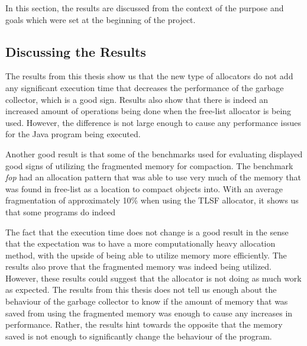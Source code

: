 
In this section, the results are discussed from the context of the purpose and goals which were set at the beginning of the project. 

\subsection{Discussing the Results}
The results from this thesis show us that the new type of allocators do not add any significant execution time that decreases the performance of the garbage collector, which is a good sign. Results also show that there is indeed an increased amount of operations being done when the free-list allocator is being used. However, the difference is not large enough to cause any performance issues for the Java program being executed. 

Another good result is that some of the benchmarks used for evaluating displayed good signs of utilizing the fragmented memory for compaction. The benchmark \textit{fop} had an allocation pattern that was able to use very much of the memory that was found in free-list as a location to compact objects into. With an average fragmentation of approximately 10\% when using the TLSF allocator, it shows us that some programs do indeed 

The fact that the execution time does not change is a good result in the sense that the expectation was to have a more computationally heavy allocation method, with the upside of being able to utilize memory more efficiently. The results also prove that the fragmented memory was indeed being utilized. However, these results could suggest that the allocator is not doing as much work as expected. The results from this thesis does not tell us enough about the behaviour of the garbage collector to know if the amount of memory that was saved from using the fragmented memory was enough to cause any increases in performance. Rather, the results hint towards the opposite that the memory saved is not enough to significantly change the behaviour of the program.



